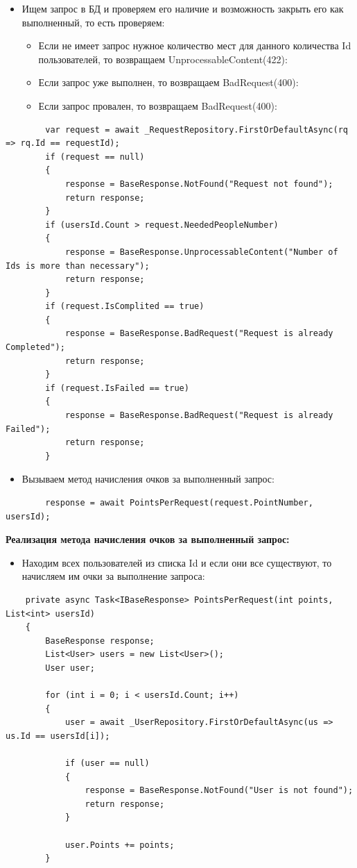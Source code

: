 \begin{itemize}
	\item{Ищем запрос в БД и проверяем его наличие и возможность закрыть его как выполненный, то есть проверяем:
			\begin{itemize}
				\item{Если не имеет запрос нужное количество мест для данного количества Id пользователей, то возвращаем UnprocessableContent(422):}
				\item{Если запрос уже выполнен, то возвращаем BadRequest(400):}
				\item{Если запрос провален, то возвращаем BadRequest(400):}
			\end{itemize}
		}
\end{itemize}
\begin{verbatim}
        var request = await _RequestRepository.FirstOrDefaultAsync(rq => rq.Id == requestId);
        if (request == null)
        {
            response = BaseResponse.NotFound("Request not found");
            return response;
        }
        if (usersId.Count > request.NeededPeopleNumber)
        {
            response = BaseResponse.UnprocessableContent("Number of Ids is more than necessary");
            return response;
        }
        if (request.IsComplited == true)
        {
            response = BaseResponse.BadRequest("Request is already Completed");
            return response;
        }
        if (request.IsFailed == true)
        {
            response = BaseResponse.BadRequest("Request is already Failed");
            return response;
        }
\end{verbatim}

\begin{itemize}
	\item{Вызываем метод начисления очков за выполненный запрос:}
\end{itemize}
\begin{verbatim}
        response = await PointsPerRequest(request.PointNumber, usersId);
\end{verbatim}

\textbf{Реализация метода начисления очков за выполненный запрос:}
\begin{itemize}
	\item{Находим всех пользователей из списка Id и если они все существуют, то начисляем им очки за выполнение запроса:}
\end{itemize}
\begin{verbatim}
    private async Task<IBaseResponse> PointsPerRequest(int points, List<int> usersId)
    {
        BaseResponse response;
        List<User> users = new List<User>();
        User user;

        for (int i = 0; i < usersId.Count; i++)
        {
            user = await _UserRepository.FirstOrDefaultAsync(us => us.Id == usersId[i]);

            if (user == null)
            {
                response = BaseResponse.NotFound("User is not found");
                return response;
            }

            user.Points += points;
        }
\end{verbatim}

